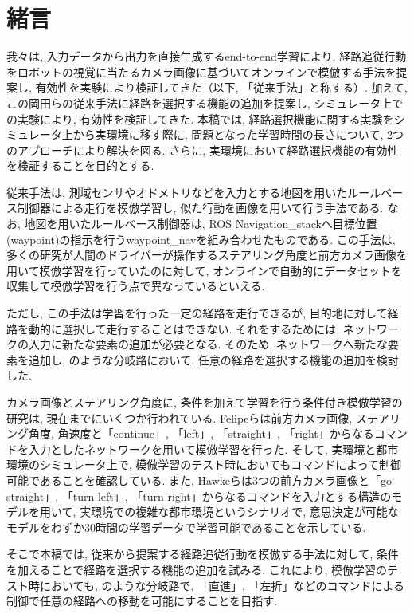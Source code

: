 \documentclass{jarticle}
\begin{document}
\date{} %

\maketitle
\thispagestyle{empty}
\pagestyle{empty}

\small
\section{緒言}%
我々は, 入力データから出力を直接生成するend-to-end学習により, 経路追従行動をロボットの視覚に当たるカメラ画像に基づいてオンラインで模倣する手法を提案し, 有効性を実験により検証してきた\cite{okada1}\cite{okada2}（以下, 「従来手法」と称する）. 加えて, この岡田らの従来手法に経路を選択する機能の追加を提案し, シミュレータ上での実験により, 有効性を検証してきた\cite{mech}. 本稿では, 経路選択機能に関する実験をシミュレータ上から実環境に移す際に, 問題となった学習時間の長さについて, 2つのアプローチにより解決を図る. さらに, 実環境において経路選択機能の有効性を検証することを目的とする.
\par
従来手法は, 測域センサやオドメトリなどを入力とする地図を用いたルールベース制御器による走行を模倣学習し, 似た行動を画像を用いて行う手法である. なお, 地図を用いたルールベース制御器は, ROS Navigation\_stackへ目標位置(waypoint)の指示を行うwaypoint\_navを組み合わせたものである. この手法は, 多くの研究\cite{bojarski}\cite{moridian}\cite{hawke}が人間のドライバーが操作するステアリング角度と前方カメラ画像を用いて模倣学習を行っていたのに対して, オンラインで自動的にデータセットを収集して模倣学習を行う点で異なっているといえる.
\par
ただし, この手法は学習を行った一定の経路を走行できるが, 目的地に対して経路を動的に選択して走行することはできない. それをするためには, ネットワークの入力に新たな要素の追加が必要となる. そのため, ネットワークへ新たな要素を追加し, のような分岐路において, 任意の経路を選択する機能の追加を検討した.
\par
カメラ画像とステアリング角度に, 条件を加えて学習を行う条件付き模倣学習の研究は, 現在までにいくつか行われている. Felipeら\cite{felipe}は前方カメラ画像, ステアリング角度, 角速度と「continue」, 「left」, 「straight」, 「right」からなるコマンドを入力としたネットワークを用いて模倣学習を行った. そして, 実環境と都市環境のシミュレータ上で, 模倣学習のテスト時においてもコマンドによって制御可能であることを確認している. また, Hawkeら\cite{hawke}は3つの前方カメラ画像と「go straight」, 「turn left」, 「turn right」からなるコマンドを入力とする構造のモデルを用いて, 実環境での複雑な都市環境というシナリオで, 意思決定が可能なモデルをわずか30時間の学習データで学習可能であることを示している.
\par
そこで本稿では, 従来から提案する経路追従行動を模倣する手法に対して, 条件を加えることで経路を選択する機能の追加を試みる. これにより, 模倣学習のテスト時においても, のような分岐路で, 
「直進」, 「左折」などのコマンドによる制御で任意の経路への移動を可能にすることを目指す.
\end{document}
